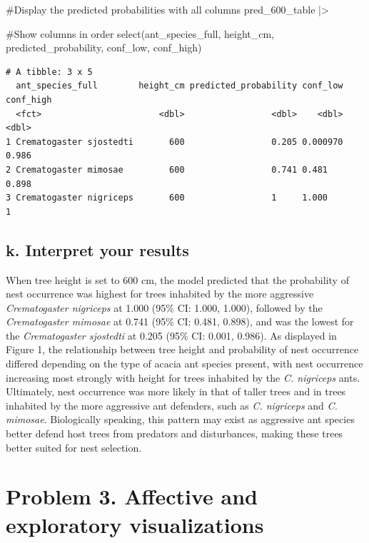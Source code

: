 \documentclass[
  letterpaper,
  DIV=11,
  numbers=noendperiod]{scrartcl}
\newenvironment{Shaded}{\begin{snugshade}}{\end{snugshade}}
\newcommand{\CommentTok}[1]{\textcolor[rgb]{0.37,0.37,0.37}{#1}}
\newcommand{\FunctionTok}[1]{\textcolor[rgb]{0.28,0.35,0.67}{#1}}
\newcommand{\NormalTok}[1]{\textcolor[rgb]{0.00,0.23,0.31}{#1}}
\newcommand{\SpecialCharTok}[1]{\textcolor[rgb]{0.37,0.37,0.37}{#1}}
\begin{document}
\begin{Shaded}
\begin{Highlighting}[]
\CommentTok{\#Display the predicted probabilities with all columns}
\NormalTok{pred\_600\_table }\SpecialCharTok{|\textgreater{}}
  
  \CommentTok{\#Show columns in order }
  \FunctionTok{select}\NormalTok{(ant\_species\_full,}
\NormalTok{         height\_cm,}
\NormalTok{         predicted\_probability,}
\NormalTok{         conf\_low,}
\NormalTok{         conf\_high)}
\end{Highlighting}
\end{Shaded}

\begin{verbatim}
# A tibble: 3 x 5
  ant_species_full        height_cm predicted_probability conf_low conf_high
  <fct>                       <dbl>                 <dbl>    <dbl>     <dbl>
1 Crematogaster sjostedti       600                 0.205 0.000970     0.986
2 Crematogaster mimosae         600                 0.741 0.481        0.898
3 Crematogaster nigriceps       600                 1     1.000        1    
\end{verbatim}

\subsection{k. Interpret your results}\label{k.-interpret-your-results}

When tree height is set to 600 cm, the model predicted that the
probability of nest occurrence was highest for trees inhabited by the
more aggressive \emph{Crematogaster nigriceps} at 1.000 (95\% CI: 1.000,
1.000), followed by the \emph{Crematogaster mimosae} at 0.741 (95\% CI:
0.481, 0.898), and was the lowest for the \emph{Crematogaster sjostedti}
at 0.205 (95\% CI: 0.001, 0.986). As displayed in Figure 1, the
relationship between tree height and probability of nest occurrence
differed depending on the type of acacia ant species present, with nest
occurrence increasing most strongly with height for trees inhabited by
the \emph{C. nigriceps} ants. Ultimately, nest occurrence was more
likely in that of taller trees and in trees inhabited by the more
aggressive ant defenders, such as \emph{C. nigriceps} and \emph{C.
mimosae}. Biologically speaking, this pattern may exist as aggressive
ant species better defend host trees from predators and disturbances,
making these trees better suited for nest selection.

\section{Problem 3. Affective and exploratory
visualizations}\label{problem-3.-affective-and-exploratory-visualizations}
\end{document}
